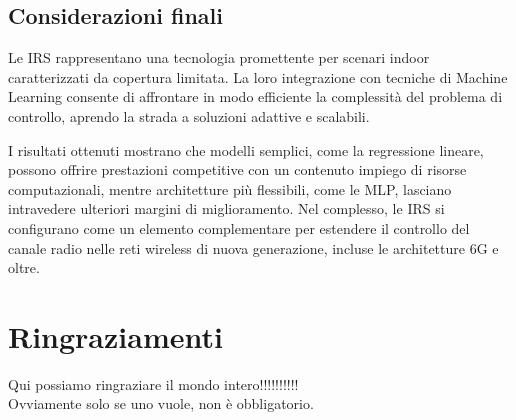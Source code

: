 \documentclass[12pt,a4paper]{report}
\begin{document}
\newpage
\section{Considerazioni finali}
Le IRS rappresentano una tecnologia promettente per scenari indoor
caratterizzati da copertura limitata. La loro integrazione con
tecniche di Machine Learning consente di affrontare in modo
efficiente la complessità del problema di controllo, aprendo la
strada a soluzioni adattive e scalabili.

I risultati ottenuti mostrano che modelli semplici, come la
regressione lineare, possono offrire prestazioni competitive con un
contenuto impiego di risorse computazionali, mentre architetture più
flessibili, come le MLP, lasciano intravedere ulteriori margini di
miglioramento. Nel complesso, le IRS si configurano come un elemento
complementare per estendere il controllo del canale radio nelle reti
wireless di nuova generazione, incluse le architetture 6G e oltre.

\clearpage{\pagestyle{empty}\cleardoublepage}

\chapter*{Ringraziamenti}
\thispagestyle{empty}
Qui possiamo ringraziare il mondo intero!!!!!!!!!!\\
Ovviamente solo se uno vuole, non \`e obbligatorio.



\end{document}
